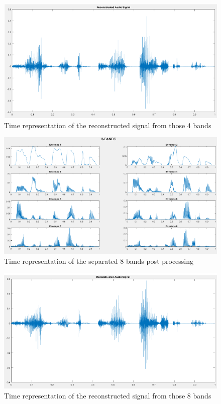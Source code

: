 \documentclass{article}
\begin{document}
\begin{figure}[!ht]
\includegraphics[width=\textwidth]{4br.png}
\caption{Time representation of the reconstructed signal from those 4 bands}
\label{fig:4br}
\end{figure}

\begin{figure}[!ht]
\includegraphics[width=\textwidth]{8_bands.png}
\caption{Time representation of the separated 8 bands post processing}
\label{fig:8b}
\end{figure}

\begin{figure}[!ht]
\includegraphics[width=\textwidth]{8br.png}
\caption{Time representation of the reconstructed signal from those 8 bands}
\label{fig:8br}
\end{figure}
\end{document}
